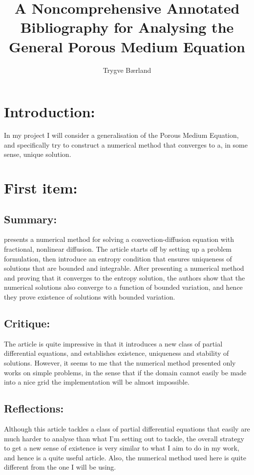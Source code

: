 \documentclass[11pt, a4paper]{article}
\begin{document}
\title{A Noncomprehensive Annotated Bibliography for Analysing the General Porous Medium Equation}
\author{Trygve Bærland}
\maketitle
\section*{Introduction:}
In my project I will consider a generalisation of the Porous Medium Equation, and specifically try to construct a numerical method that converges to a, in some sense, unique solution.


\section{First item:}
\subsection{Summary:}
\cite{Cifani} presents a numerical method for solving a convection-diffusion equation with fractional, nonlinear diffusion. The article starts off by setting up a problem formulation, then introduce an entropy condition that ensures uniqueness of solutions that are bounded and integrable. After presenting a numerical method and proving that it converges to the entropy solution, the authors show that the numerical solutions also converge to a function of bounded variation, and hence they prove existence of solutions with bounded variation.

\subsection{Critique:}
The article is quite impressive in that it introduces a new class of partial differential equations, and establishes existence, uniqueness and stability of solutions. However, it seems to me that the numerical method presented only works on simple problems, in the sense that if the domain cannot easily be made into a nice grid the implementation will be almost impossible.

\subsection{Reflections:}
Although this article tackles a class of partial differential equations that easily are much harder to analyse than what I'm setting out to tackle, the overall strategy to get a new sense of existence is very similar to what I aim to do in my work, and hence is a quite useful article. Also, the numerical method used here is quite different from the one I will be using.
\end{document}
